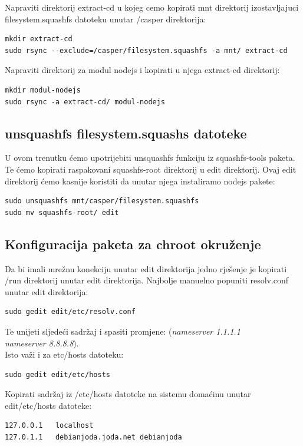 \documentclass[12pt,vi]{mitthesis}
\begin{document}
\noindent
Napraviti direktorij extract-cd u kojeg cemo kopirati mnt direktorij izostavljajuci filesystem.squashfs datoteku unutar /casper direktorija:
\begin{lstlisting}[style=BashInputStyle]
mkdir extract-cd
sudo rsync --exclude=/casper/filesystem.squashfs -a mnt/ extract-cd
\end{lstlisting}

\noindent
Napraviti direktorij za modul nodejs i kopirati u njega extract-cd direktorij:
\begin{lstlisting}[style=BashInputStyle]
mkdir modul-nodejs
sudo rsync -a extract-cd/ modul-nodejs
\end{lstlisting}

\subsection*{unsquashfs filesystem.squashs datoteke}
\noindent
U ovom trenutku ćemo upotrijebiti unsquashfs funkciju iz squashfs-tools paketa. Te ćemo kopirati raspakovani squashfs-root direktorij u edit direktorij. Ovaj edit direktorij ćemo kasnije koristiti da unutar njega instaliramo nodejs pakete:
\begin{lstlisting}[style=BashInputStyle]
sudo unsquashfs mnt/casper/filesystem.squashfs
sudo mv squashfs-root/ edit
\end{lstlisting}

\subsection*{Konfiguracija paketa za chroot okruženje}
\indent
Da bi imali mrežnu konekciju unutar edit direktorija jedno rješenje je kopirati /run direktorij unutar edit direktorija.
Najbolje manuelno popuniti resolv.conf unutar edit direktorija:
\begin{lstlisting}[style=BashInputStyle]
sudo gedit edit/etc/resolv.conf
\end{lstlisting}
Te unijeti sljedeći sadržaj i spasiti promjene:
(\textit{nameserver 1.1.1.1 \\
nameserver 8.8.8.8}).\\
\noindent
Isto važi i za etc/hosts datoteku:
\begin{lstlisting}[style=BashInputStyle]
sudo gedit edit/etc/hosts
\end{lstlisting}
Kopirati sadržaj iz /etc/hosts datoteke na sistemu domaćinu unutar edit/etc/hosts datoteke:
\begin{lstlisting}
127.0.0.1	localhost
127.0.1.1	debianjoda.joda.net	debianjoda
\end{lstlisting}
\end{document}
